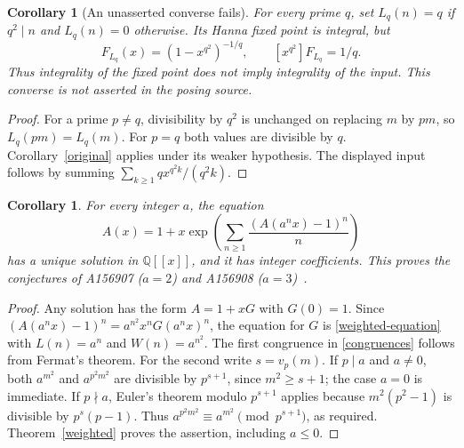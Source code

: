 \documentclass[11pt]{article}
\newtheorem{corollary}[theorem]{Corollary}
\newcommand{\Q}{\mathbb Q}
\begin{document}
\begin{corollary}[An unasserted converse fails]\label{converse}
For every prime $q$, set $L_q(n)=q$ if $q^2\mid n$ and $L_q(n)=0$
otherwise. Its Hanna fixed point is integral, but
\[
 F_{L_q}(x)=(1-x^{q^2})^{-1/q},\qquad [x^{q^2}]F_{L_q}=1/q.
\]
Thus integrality of the fixed point does not imply integrality of the input.
This converse is not asserted in the posing source.
\end{corollary}
\begin{proof}
For a prime $p\ne q$, divisibility by $q^2$ is unchanged on replacing $m$
by $pm$, so $L_q(pm)=L_q(m)$. For $p=q$ both values are divisible by $q$.
Corollary~\ref{original} applies under its weaker hypothesis. The displayed
input follows by summing $\sum_{k\geq1}q x^{q^2k}/(q^2k)$.
\end{proof}

\begin{corollary}\label{shifted}
For every integer $a$, the equation
\begin{equation}\label{shifted-equation}
 A(x)=1+x\exp\left(\sum_{n\geq1}\frac{(A(a^nx)-1)^n}{n}\right)
\end{equation}
has a unique solution in $\Q[[x]]$, and it has integer coefficients.
This proves the conjectures of A156907 ($a=2$) and A156908 ($a=3$)~\cite{oeis156907}.
\end{corollary}
\begin{proof}
Any solution has the form $A=1+xG$ with $G(0)=1$.
Since $(A(a^nx)-1)^n=a^{n^2}x^nG(a^nx)^n$, the equation for $G$
is \eqref{weighted-equation} with $L(n)=a^n$ and $W(n)=a^{n^2}$.
The first congruence in \eqref{congruences} follows from Fermat's theorem.
For the second write $s=v_p(m)$.
If $p\mid a$ and $a\ne0$, both $a^{m^2}$ and $a^{p^2m^2}$ are divisible
by $p^{s+1}$, since $m^2\geq s+1$; the case $a=0$ is immediate.
If $p\nmid a$, Euler's theorem modulo $p^{s+1}$ applies because
$m^2(p^2-1)$ is divisible by $p^s(p-1)$.
Thus $a^{p^2m^2}\equiv a^{m^2}\pmod{p^{s+1}}$, as required.
Theorem~\ref{weighted} proves the assertion, including $a\leq0$.
\end{proof}
\end{document}
